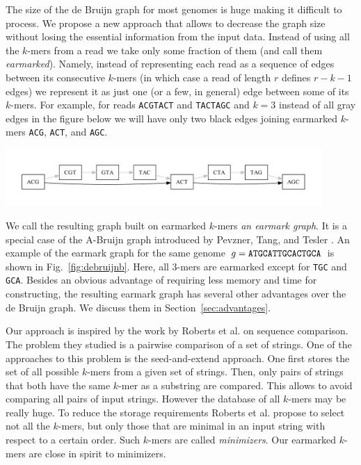 \documentclass[12pt]{article}
\begin{document}
The size of the de Bruijn graph for most genomes is huge making
it difficult to process. 
We propose a new approach that allows to decrease
the graph size without losing the essential information from the input data.
Instead of using all the $k$-mers from a read we take only some fraction of them
(and call them \emph{earmarked}).
Namely, instead 
of representing each read as a sequence of edges 
between its consecutive $k$-mers (in which case a read of length $r$ defines
$r-k-1$ edges) we represent it as just one (or a few, in general)
edge between some of its $k$-mers. For example, for 
reads {\tt ACGTACT} and {\tt TACTAGC} and $k=3$
instead of all gray edges in the figure below we will have 
only two black edges joining earmarked $k$-mers {\tt ACG}, {\tt ACT}, and {\tt AGC}.
\begin{center}
\includegraphics[width=0.9\textwidth]{fig1.pdf}
\end{center}
We call the resulting graph built on earmarked $k$-mers \emph{an earmark graph}.
It is a special case of the A-Bruijn graph introduced by Pevzner, Tang, and Tesler \cite{PTG04}.
An example of the earmark graph for the same genome $g={\tt ATGCATTGCACTGCA}$ 
is shown in Fig.~\ref{fig:debruijnb}.
Here, all $3$-mers are earmarked except for {\tt TGC} and {\tt GCA}.
Besides an obvious advantage of requiring less memory 
and time for constructing, the resulting earmark graph has several other advantages over the
de Bruijn graph. We discuss them 
in Section~\ref{sec:advantages}.

Our approach is inspired by the work by Roberts et al. \cite{RW04} on sequence comparison.
The problem they studied is a pairwise comparison of a set of strings. 
One of the approaches to this problem is the seed-and-extend approach.
One first stores the set of all possible $k$-mers from a given set of strings.
Then, only pairs of strings that both have the same $k$-mer as a substring are compared.
This allows to avoid comparing all pairs of input strings. However the database
of all $k$-mers may be really huge. To reduce the storage requirements Roberts et al. propose
to select not all the $k$-mers, but only those that are minimal in an input string with respect
to a certain order. Such $k$-mers are called \emph{minimizers}. Our earmarked $k$-mers are close in spirit 
to minimizers.
\end{document}
